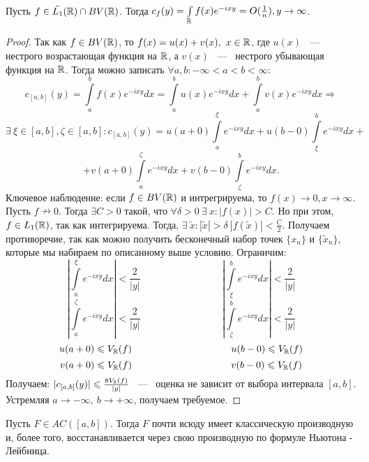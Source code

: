 \begin{lemma}[Основная]
    Пусть $f \in \tilde{L_1}(\mathbb{R}) \cap BV(\mathbb{R})$. Тогда $c_f(y) = \int\limits_{\mathbb{R}}f(x) e^{-ixy} = O(\frac{1}{n}), y \rightarrow \infty$.
\end{lemma}
\begin{proof}
    Так как $f \in BV(\mathbb{R})$, то $f(x) = u(x) + v(x), \ x \in \mathbb{R}$, где $u(x)$ ~---~ нестрого возрастающая функция на $\mathbb{R}$, а $v(x)$ ~---~ нестрого убывающая функция на $\mathbb{R}$. \newline
    Тогда можно записать $\forall a, b : -\infty < a < b < \infty$:
    $$
    c_{[a, b]}(y) = \int\limits_{a}^{b} f(x) e^{-ixy} dx = \int\limits_{a}^{b} u(x) e^{-ixy} dx + \int\limits_{a}^{b} v(x) e^{-ixy} dx \Rightarrow
    $$
    $$
    \exists \ \xi \in [a, b], \zeta \in [a, b] : c_{[a, b]}(y) = u(a + 0) \int\limits_{a}^{\xi} e^{-ixy} dx + u(b - 0)\int\limits_{\xi}^{b} e^{-ixy} dx + 
    $$
    $$
     + v(a + 0) \int\limits_{a}^{\zeta} e^{-ixy} dx + v(b - 0) \int\limits_{\zeta}^{b} e^{-ixy} dx.
    $$
    Ключевое наблюдение: если $f \in BV(\mathbb{R})$ и интрегрируема, то $f(x) \rightarrow 0, x \rightarrow \infty$. \newline
    Пусть $f \nrightarrow 0$. Тогда $\exists C > 0$ такой, что $\forall \delta > 0 \ \exists \ x : |f(x)| > C$. Но при этом, $f \in L_1(\mathbb{R})$, так как интегрируема. Тогда, $\exists \ \tilde{x} : |\tilde{x}| > \delta \  |f(\tilde{x})| < \frac{C}{2}$. Получаем противоречие, так как можно получить бесконечный набор точек $\{x_n\}$ и $\{\tilde{x}_n\}$, которые мы набираем по описанному выше условию. \newline
    Ограничим: 
    $$
    \left| \int\limits_{a}^{\xi} e^{-ixy} dx \right| < \frac{2}{|y|} \hspace{100pt} \left| \int\limits_{\xi}^{b} e^{-ixy} dx \right| < \frac{2}{|y|}
    $$
    $$
    \left| \int\limits_{a}^{\zeta} e^{-ixy} dx \right| < \frac{2}{|y|} \hspace{100pt} \left| \int\limits_{\zeta}^{b} e^{-ixy} dx \right| < \frac{2}{|y|}
    $$
    $$
    u(a + 0) \le V_{\R}(f) \hspace{102pt} u(b - 0) \le V_{\R}(f)
    $$
    $$
    v(a + 0) \le V_{\R}(f) \hspace{102pt} v(b - 0) \le V_{\R}(f)
    $$
    Получаем: $|c_{[a, b]}(y)| \leqslant \frac{8 V_{\mathbb{R}}(f)}{|y|}$ ~---~ оценка не зависит от выбора интервала $[a, b]$. Устремляя $a \rightarrow -\infty, \ b \rightarrow +\infty$, получаем требуемое. 
\end{proof}

\begin{theorem}[б/д]
    Пусть $F \in AC([a, b])$. Тогда $F$ почти всюду имеет классическую производную и, более того, восстанавливается через свою производную по формуле Ньютона - Лейбница. 
\end{theorem}

